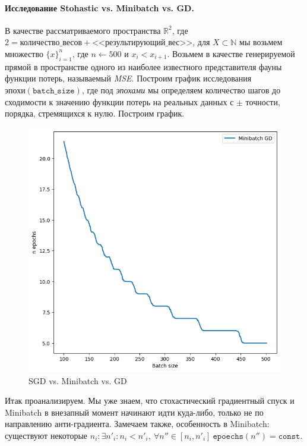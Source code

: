 \documentclass[12pt, a4paper, oneside, final]{article}
\begin{document}
	\paragraph{Исследование Stohastic vs. Minibatch vs. GD.}
	В качестве рассматриваемого пространства $\mathbb{R}^{2}$, где $2 = \texttt{количество\_весов} + \texttt{<<результирующий\_вес>>}$, для $X \subset \mathbb{N}$ мы возьмем множество $\{x\}_{i = 1}^{n}$, где $n \gets 500$ и $x_{i} < x_{i + 1}$.
	Возьмем в качестве генерируемой прямой в пространстве одного из наиболее известного представителя фауны функции потерь, называемый \textit{MSE}.
	Построим график исследования $\texttt{эпохи}(\texttt{batch\_size})$, где под \textit{эпохами} мы определяем количество шагов до сходимости к значению функции потерь на реальных данных с $\pm$ точности, порядка, стремящихся к нулю.
	Построим график.
	\begin{figure}[H]
		\centering
		\includegraphics[scale = 0.55]{Image/T1_ECHOES_BATCHSIEZ.png}
		\caption*{SGD vs. Minibatch vs. GD}
	\end{figure}
	Итак проанализируем.
	Мы уже знаем, что стохастический градиентный спуск и Minibatch в внезапный момент начинают идти куда-либо, только не по направлению анти-градиента.
	Замечаем также, особенность в Minibatch: существуют некоторые $n_{i} : \exists n'_{i} : n_{i} < n'_{i}, ~ \forall n'' \in [n_{i}, n'_{i}] ~ \texttt{epoechs}(n'') = \texttt{const}$.
\end{document}

